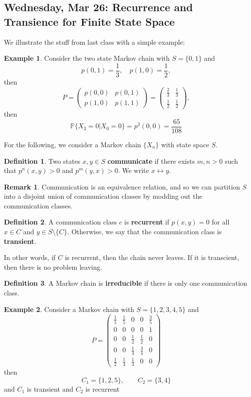 \documentclass[10pt, oneside]{article}
\newcommand{\bbP}{\mathbb{P}}
\theoremstyle{definition}
\newtheorem{exmp}{Example}[section]
\newtheorem{defn}{Definition}
\newtheorem{rem}{Remark}
\begin{document}
\subsection{Wednesday, Mar 26: Recurrence and Transience for Finite State Space}
We illustrate the stuff from last class with a simple example:
\begin{exmp}
    Consider the two state Markov chain with $S = \{0,1\}$ and 
    \[p(0,1) = \frac{1}{3}, \quad p(1,0) = \frac{1}{2},\] then 
    \[P = \begin{pmatrix}
        p(0,0) & p(0,1)\\
        p(1,0) & p(1,1) 
    \end{pmatrix} = \begin{pmatrix}
        \frac{2}{3} & \frac{1}{3}\\
        \frac{1}{2} & \frac{1}{2}
    \end{pmatrix},\] then 
    \[\bbP\{X_3 = 0 | X_0 = 0\} = p^3(0,0) = \frac{65}{108}\]
\end{exmp}
For the following, we consider a Markov chain $\{X_n\}$ with state space $S.$
\begin{defn}
    Two states $x,y \in S$ \textbf{communicate} if there exists $m,n >0$ such that $p^n(x,y) >0$ and $p^m(y,x) > 0 .$ We write $x \leftrightarrow y.$
\end{defn}
\begin{rem}
    Communication is an equivalence relation, and so we can partition $S$ into a disjoint union of communication classes by modding out the communication classes.
\end{rem}
\begin{defn}
    A communication class $c$ is \textbf{recurrent} if $p(x,y) = 0$ for all $x\in C$ and $y \in S\setminus\{C\}.$ Otherwise, we say that the communication class is \textbf{transient}.
\end{defn}
In other words, if $C$ is recurrent, then the chain never leaves. If it is transcient, then there is no problem leaving.


\begin{defn}
    A Markov chain is \textbf{irreducible} if there is only one communication class.
\end{defn}

\begin{exmp}
    Consider a Markov chain with $S  = \{1,2,3,4,5\}$ and 
    \[P = \begin{pmatrix}
        \frac{1}{5} & \frac{1}{5} & 0 & 0 & \frac{3}{5}\\
        0 & 0 & 0 & 0 & 1\\
        0 & 0 & \frac{1}{2} & \frac{1}{2} & 0\\
        0 & 0 & \frac{1}{4} & \frac{3}{4} & 0\\
        \frac{1}{2} & \frac{1}{4} & \frac{1}{4} & 0 & 0
    \end{pmatrix}\] then 
    \[C_1 = \{1,2,5\}, \qquad C_2 = \{3,4\}\] and $C_1$ is transient and $C_2$ is recurrent
\end{exmp}
\end{document}
